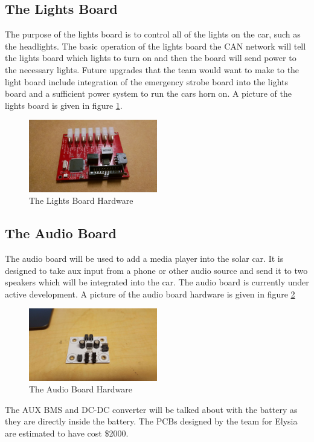 \documentclass{article}
\begin{document}
    \subsection{The Lights Board}
    The purpose of the lights board is to control all of the lights on
    the car, such as the headlights. The basic operation of the lights
    board the CAN network will tell the lights board which lights to
    turn on and then the board will send power to the necessary lights.
    Future upgrades that the team would want to make to the light board
    include integration of the emergency strobe board into the lights
    board and a sufficient power system to run the cars horn on. A
    picture of the lights board is given in figure \ref{fig:lights_HW}.
    \begin{figure}[H]
        \centering
        \includegraphics[width=0.5\textwidth]{images/light_board.jpeg}
        \caption{The Lights Board Hardware}
        \label{fig:lights_HW}
    \end{figure}
    \subsection{The Audio Board}
    The audio board will be used to add a media player into the solar
    car. It is designed to take aux input from a phone or other audio
    source and send it to two speakers which will be integrated into the
    car. The audio board is currently under active development. A
    picture of the audio board hardware is given in figure
    \ref{fig:audio}
    \begin{figure}[H]
        \centering
        \includegraphics[width=0.5\textwidth]{images/audio_board.jpg}
        \caption{The Audio Board Hardware}
        \label{fig:audio}
    \end{figure}
    The AUX BMS and DC-DC converter will be talked about with the
    battery as they are directly inside the battery. The PCBs designed
    by the team for Elysia are estimated to have cost \$2000.
\end{document}
